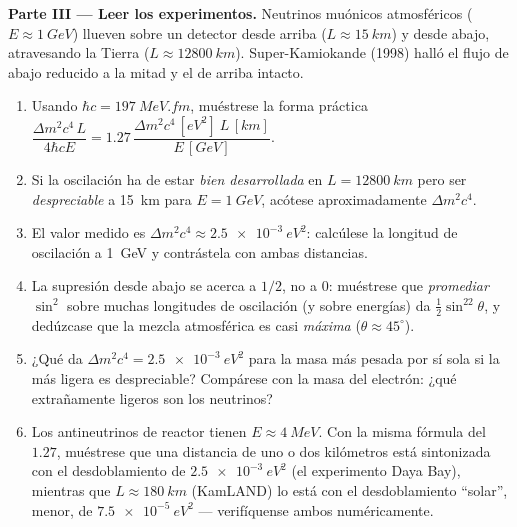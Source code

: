\begin{problem}
\medskip\noindent\textbf{Parte III --- Leer los experimentos.}
Neutrinos muónicos atmosféricos ($E \approx \qty{1}{GeV}$) llueven sobre un
detector desde arriba ($L \approx \qty{15}{km}$) y desde abajo,
atravesando la Tierra ($L \approx \qty{12800}{km}$). Super-Kamiokande
(1998) halló el flujo de abajo reducido a la mitad y el de arriba intacto.
\begin{enumerate}[resume]
  \item Usando $\hbar c = \qty{197}{MeV.fm}$, muéstrese la forma práctica
        $\dfrac{\Delta m^2c^4\,L}{4\hbar cE} = 1.27\,
        \dfrac{\Delta m^2c^4\,[\unit{eV^2}]\ L\,[\unit{km}]}
        {E\,[\unit{GeV}]}$.
  \item Si la oscilación ha de estar \emph{bien desarrollada} en $L =
        \qty{12800}{km}$ pero ser \emph{despreciable} a \qty{15}{km} para
        $E = \qty{1}{GeV}$, acótese aproximadamente $\Delta m^2c^4$.
  \item El valor medido es $\Delta m^2c^4 \approx
        \qty{2.5e-3}{eV^2}$: calcúlese la longitud de oscilación a
        \qty{1}{GeV} y contrástela con ambas distancias.
  \item La supresión desde abajo se acerca a $1/2$, no a $0$:
        muéstrese que \emph{promediar} $\sin^2$ sobre muchas longitudes de
        oscilación (y sobre energías) da $\tfrac12\sin^22\theta$,
        y dedúzcase que la mezcla atmosférica es casi
        \emph{máxima} ($\theta \approx 45^\circ$).
  \item ¿Qué da $\Delta m^2c^4 = \qty{2.5e-3}{eV^2}$ para la masa más
        pesada por sí sola si la más ligera es despreciable? Compárese con
        la masa del electrón: ¿qué extrañamente ligeros son los neutrinos?
  \item Los antineutrinos de reactor tienen $E \approx \qty{4}{MeV}$. Con
        la misma fórmula del $1.27$, muéstrese que una distancia de uno o
        dos kilómetros está sintonizada con el desdoblamiento de
        $\qty{2.5e-3}{eV^2}$ (el experimento Daya Bay), mientras que
        $L \approx \qty{180}{km}$ (KamLAND) lo está con el desdoblamiento
        ``solar'', menor, de $\qty{7.5e-5}{eV^2}$ --- verifíquense ambos
        numéricamente.
\end{enumerate}


\end{problem}

